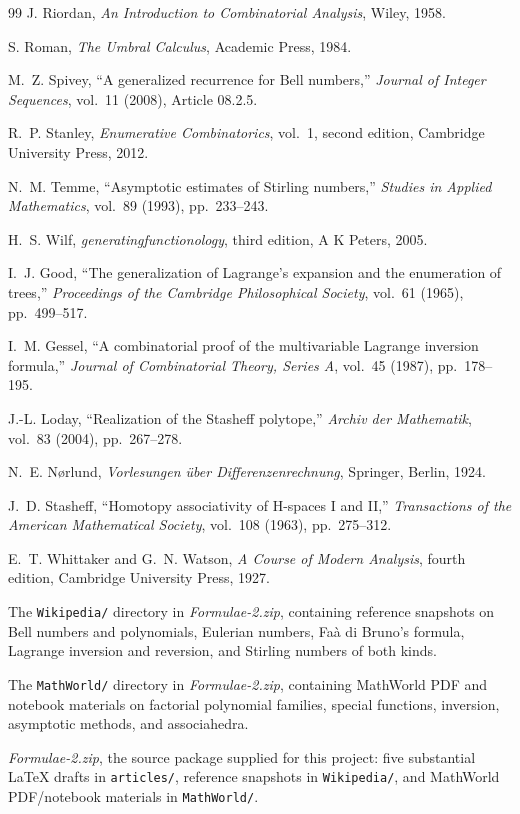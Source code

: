\documentclass[11pt,a4paper,oneside,openany]{book}
\theoremstyle{definition}
\theoremstyle{remark}
\begin{document}
\begin{thebibliography}{99}
J. Riordan,
\emph{An Introduction to Combinatorial Analysis},
Wiley, 1958.

S. Roman,
\emph{The Umbral Calculus},
Academic Press, 1984.

M.~Z. Spivey,
``A generalized recurrence for Bell numbers,''
\emph{Journal of Integer Sequences}, vol.~11 (2008), Article 08.2.5.

R.~P. Stanley,
\emph{Enumerative Combinatorics}, vol.~1, second edition,
Cambridge University Press, 2012.

N.~M. Temme,
``Asymptotic estimates of Stirling numbers,''
\emph{Studies in Applied Mathematics}, vol.~89 (1993), pp.~233--243.

H.~S. Wilf,
\emph{generatingfunctionology}, third edition,
A K Peters, 2005.

I.~J. Good,
``The generalization of Lagrange's expansion and the enumeration of trees,''
\emph{Proceedings of the Cambridge Philosophical Society}, vol.~61 (1965),
pp.~499--517.

I.~M. Gessel,
``A combinatorial proof of the multivariable Lagrange inversion formula,''
\emph{Journal of Combinatorial Theory, Series A}, vol.~45 (1987), pp.~178--195.

J.-L. Loday,
``Realization of the Stasheff polytope,''
\emph{Archiv der Mathematik}, vol.~83 (2004), pp.~267--278.

N.~E. N\o rlund,
\emph{Vorlesungen \"uber Differenzenrechnung},
Springer, Berlin, 1924.

J.~D. Stasheff,
``Homotopy associativity of H-spaces I and II,''
\emph{Transactions of the American Mathematical Society}, vol.~108 (1963),
pp.~275--312.

E.~T. Whittaker and G.~N. Watson,
\emph{A Course of Modern Analysis}, fourth edition,
Cambridge University Press, 1927.

The \nolinkurl{Wikipedia/} directory in \emph{Formulae-2.zip}, containing
reference snapshots on Bell numbers and polynomials, Eulerian numbers,
Fa\`a di Bruno's formula, Lagrange inversion and reversion, and Stirling
numbers of both kinds.

The \nolinkurl{MathWorld/} directory in \emph{Formulae-2.zip}, containing
MathWorld PDF and notebook materials on factorial polynomial families,
special functions, inversion, asymptotic methods, and associahedra.

\emph{Formulae-2.zip}, the source package supplied for this project: five
substantial LaTeX drafts in \nolinkurl{articles/}, reference snapshots in
\nolinkurl{Wikipedia/}, and MathWorld PDF/notebook materials in
\nolinkurl{MathWorld/}.

\end{thebibliography}

\printindex
\end{document}
